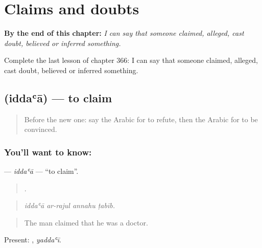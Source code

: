 
\chapter{Claims and doubts}
\label{ch:ar-claims-and-doubts}

\begin{chapteropening}
\textbf{By the end of this chapter:} \emph{I can say that someone claimed, alleged, cast doubt, believed or inferred something.}

Complete the last lesson of chapter 366: I can say that someone claimed, alleged, cast doubt, believed or inferred something.
\end{chapteropening}

\section[\texorpdfstring{\ar{ادعى} (iddaʿā)}{ادعى (iddaʿā)}]{ (iddaʿā) — to claim}

\label{lesson:AR-C366-iddaa}



\begin{quote}
Before the new one: say the Arabic for to refute, then the Arabic for to be convinced.
\end{quote}

\subsection*{You'll want to know: }
\textbf{} — \emph{iddaʿā} — \textquotedblleft{}to claim\textquotedblright{}.

\begin{quote}
   .
\end{quote}

\begin{quote}
\emph{iddaʿā ar-rajul annahu ṭabīb.}
\end{quote}

\begin{quote}
The man claimed that he was a doctor.
\end{quote}

Present: , \emph{yaddaʿī}.

